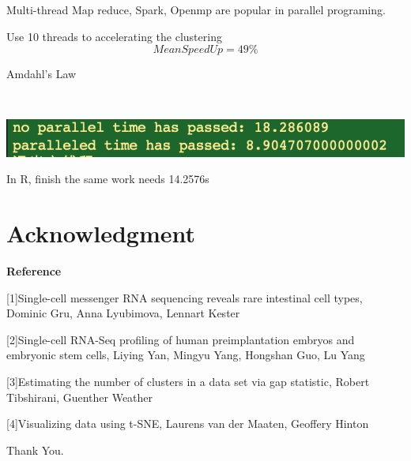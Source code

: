 \documentclass[12pt]{beamer}
\begin{document}
\begin{frame}{Multi-thread}
Map reduce, Spark, Openmp are popular in parallel programing.

Use 10 threads to accelerating the clustering
\[MeanSpeedUp=49\%\] 

Amdahl's Law

\
\

\centering
\includegraphics[scale=0.6]{fig2/parallel.png}

In R, finish the same work needs 14.2576s
\end{frame}








\section{Acknowledgment}
\begin{frame}{\textbf{Reference}}

[1]Single-cell messenger RNA sequencing reveals rare intestinal cell types, Dominic Gru, Anna Lyubimova, Lennart Kester

[2]Single-cell RNA-Seq profiling of human preimplantation embryos and embryonic stem cells, Liying Yan, Mingyu Yang, Hongshan Guo, Lu Yang

[3]Estimating the number of clusters in a data set via gap statistic, Robert Tibshirani, Guenther Weather

[4]Visualizing data using t-SNE, Laurens van der Maaten, Geoffery Hinton
\end{frame}









\begin{frame}{\textbf{}}
\centering
Thank You.
\end{frame}
\end{document}
